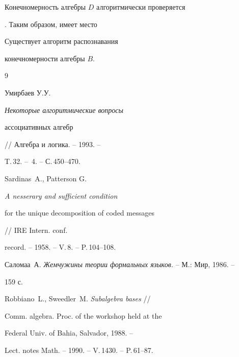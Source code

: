 Конечномерность алгебры $D$ алгоритмически проверяется


\cite{gatlat}. Таким образом, имеет место





\begin{thm}


Существует алгоритм распознавания


конечномерности алгебры $B$.


\end{thm}








\begin{thebibliography}{9}





 Умирбаев У.У. {\em Некоторые алгоритмические вопросы


ассоциативных алгебр}// Алгебра и логика. -- 1993. --


T.\,32. -- \No\,4. -- С.\,450--470.







Sardinas~A., Patterson G. {\em A nesserary and sufficient condition


for the unique decomposition of coded messages} // IRE Intern. conf.


record. -- 1958. -- V.\,8. -- P.\,104--108.







Саломаа~А. {\em Жемчужины теории формальных языков.} -- М.: Мир, 1986. --


159 с.







Robbiano~L., Sweedler~M. {\em Subalgebra bases} //


Comm. algebra. Proc. of the workshop held at the


Federal Univ. of Bahia,  Salvador, 1988. --


Lect. notes Math. -- 1990. -- V.\,1430. -- P.\,61--87.








\end{thebibliography}
